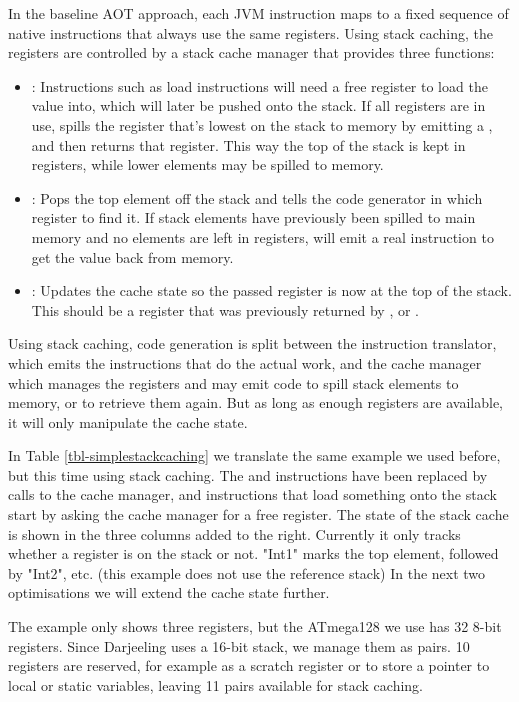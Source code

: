 In the baseline AOT approach, each JVM instruction maps to a fixed sequence of native instructions that always use the same registers. Using stack caching, the registers are controlled by a stack cache manager that provides three functions:
\begin{itemize}
    \item {}: Instructions such as load instructions will need a free register to load the value into, which will later be pushed onto the stack. If all registers are in use,  spills the register that's lowest on the stack to memory by emitting a , and then returns that register. This way the top of the stack is kept in registers, while lower elements may be spilled to memory.
    \item {}: Pops the top element off the stack and tells the code generator in which register to find it. If stack elements have previously been spilled to main memory and no  elements are left in registers,  will emit a real  instruction to get the value back from memory.
    \item {}: Updates the cache state so the passed register is now at the top of the stack. This should be a register that was previously returned by , or .
\end{itemize}

Using stack caching, code generation is split between the instruction translator, which emits the instructions that do the actual work, and the cache manager which manages the registers and may emit code to spill stack elements to memory, or to retrieve them again. But as long as enough registers are available, it will only manipulate the cache state.

In Table \ref{tbl-simplestackcaching} we translate the same example we used before, but this time using stack caching. The  and  instructions have been replaced by calls to the cache manager, and instructions that load something onto the stack start by asking the cache manager for a free register. The state of the stack cache is shown in the three columns added to the right. Currently it only tracks whether a register is on the stack or not. "Int1" marks the top element, followed by "Int2", etc. (this example does not use the reference stack) In the next two optimisations we will extend the cache state further.
 
The example only shows three registers, but the ATmega128 we use has 32 8-bit registers. Since Darjeeling uses a 16-bit stack, we manage them as pairs. 10 registers are reserved, for example as a scratch register or to store a pointer to local or static variables, leaving 11 pairs available for stack caching.

